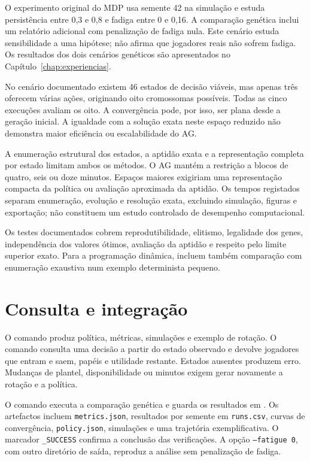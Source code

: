 O experimento original do MDP usa semente 42 na simulação e estuda
persistência entre 0,3 e 0,8 e fadiga entre 0 e 0,16. A comparação genética
inclui um relatório adicional com penalização de fadiga nula. Este cenário
estuda sensibilidade a uma hipótese; não afirma que jogadores reais não
sofrem fadiga. Os resultados dos dois cenários genéticos são apresentados
no Capítulo~\ref{chap:experiencias}.

No cenário documentado existem 46 estados de decisão viáveis, mas apenas
três oferecem várias ações, originando oito cromossomas possíveis. Todas
as cinco execuções avaliam os oito. A convergência pode, por isso, ser
plana desde a geração inicial. A igualdade com a solução exata neste
espaço reduzido não demonstra maior eficiência ou escalabilidade do AG.

A enumeração estrutural dos estados, a aptidão exata e a representação
completa por estado limitam ambos os métodos. O AG mantém a restrição a
blocos de quatro, seis ou doze minutos. Espaços maiores exigiriam uma
representação compacta da política ou avaliação aproximada da aptidão.
Os tempos registados separam enumeração, evolução e resolução exata,
excluindo simulação, figuras e exportação; não constituem um estudo
controlado de desempenho computacional.

Os testes documentados cobrem reprodutibilidade, elitismo, legalidade dos
genes, independência dos valores ótimos, avaliação da aptidão e respeito
pelo limite superior exato. Para a programação dinâmica, incluem também
comparação com enumeração exaustiva num exemplo determinista pequeno.

\section{Consulta e integração}

O comando  produz política, métricas,
simulações e exemplo de rotação. O comando
 consulta uma decisão a partir do
estado observado e devolve jogadores que entram e saem, papéis e utilidade
restante. Estados ausentes produzem erro. Mudanças de plantel,
disponibilidade ou minutos exigem gerar novamente a rotação e a política.

O comando  executa a
comparação genética e guarda os resultados em
. Os artefactos incluem
\texttt{metrics.json}, resultados por semente em \texttt{runs.csv},
curvas de convergência, \texttt{policy.json}, simulações e uma trajetória
exemplificativa. O marcador \texttt{\_SUCCESS} confirma a conclusão das
verificações. A opção \texttt{--fatigue 0}, com outro diretório de saída,
reproduz a análise sem penalização de fadiga.

